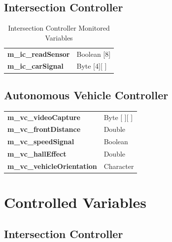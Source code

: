 \documentclass [10pt]{article}
\begin{document}
\subsection{Intersection Controller}

\begin{longtable}{ |p{ }  p{ }|}\caption{Intersection Controller Monitored Variables} \\   \hline
\textbf{m\_ic\_readSensor} & Boolean [8]  \\

\cellcolor{tableCell}\textbf{m\_ic\_carSignal}  & \cellcolor{tableCell} Byte [4][ ] \\  \hline
\end{longtable}

\subsection{Autonomous Vehicle Controller}

\begin{longtable}{ |p{ }  p{ }|}  \hline
\textbf{m\_vc\_videoCapture} & Byte [ ][ ]  \\ 

\cellcolor{tableCell}\textbf{m\_vc\_frontDistance}  & \cellcolor{tableCell}Double \\ 


\textbf{m\_vc\_speedSignal} & Boolean \\

\cellcolor{tableCell}\textbf{m\_vc\_hallEffect}  & \cellcolor{tableCell}Double \\ 

\textbf{m\_vc\_vehicleOrientation} & Character \\\hline
\end{longtable}







\section{Controlled Variables}


\subsection{Intersection Controller}
\end{document}
